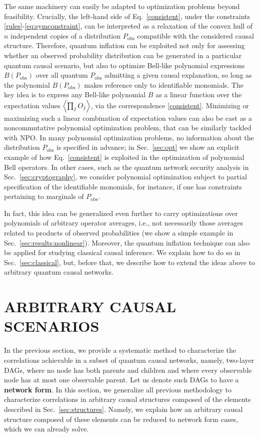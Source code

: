 \documentclass[superscriptaddress,aps,prx,nofootinbib,twocolumn,twoside,reprint,letterpaper,longbibliography]{revtex4-2}
\newcommand{\term}[1]{\textcolor{medblue}{\textbf{#1}}}
\DeclarePairedDelimiter{\expec}{\langle}{\rangle}
\begin{document}
The same machinery can easily be adapted to optimization problems beyond feasibility. Crucially, the left-hand side of Eq.~\eqref{consistent}, under the constraints \eqref{rules}-\eqref{eq:symconstraint}, can be interpreted as a relaxation of the convex hull of $n$ independent copies of a distribution $P_\text{obs}$ compatible with the considered causal structure.
Therefore, quantum inflation can be exploited not only for assessing whether an observed probability distribution can be generated in a particular quantum causal scenario, but also to optimize Bell-like polynomial expressions $B(P_\text{obs})$ over all quantum $P_\text{obs}$ admitting a given causal explanation, so long as the polynomial  $B(P_\text{obs})$ makes reference only to identifiable monomials.
The key idea is to express any Bell-like polynomial $B$ as a linear function over the expectation values $\expec*{\prod_j O_j}$, via the correspondence \eqref{consistent}. Minimizing or maximizing such a linear combination of expectation values can also be cast as a noncommutative polynomial optimization problem, that can be similarly tackled with NPO.
In many polynomial optimization problems, no information about the distribution $P_\text{obs}$ is specified in advance; in Sec.~\ref{sec:opt} we show an explicit example of how Eq.~\eqref{consistent} is exploited in the optimization of polynomial Bell operators. In other cases, such as the quantum network security analysis in Sec.~\ref{sec:cryptography}, we consider polynomial optimization subject to partial specification of the identifiable monomials, for instance, if one has constraints pertaining to marginals of $P_\text{obs}$.

In fact, this idea can be generalized even further to carry optimizations over polynomials of arbitrary operator averages, i.e., not necessarily those averages related to products of observed probabilities (we show a simple example in Sec.~\ref{sec:results:nonlinear}). Moreover, the quantum inflation technique can also be applied for studying classical causal inference. We explain how to do so in Sec.~\ref{sec:classical}, but, before that, we describe how to extend the ideas above to arbitrary quantum causal networks.

\section{ARBITRARY CAUSAL SCENARIOS}\label{sec:arbitrary}
In the previous section, we provide a systematic method to characterize the correlations achievable in a subset of quantum causal networks, namely, two-layer DAGs, where no node has both parents and children and where every observable node has at most one observable parent. Let us denote such DAGs to have a \term{network form}.
In this section, we generalize all previous methodology to characterize correlations in arbitrary causal structures composed of the elements described in Sec.~\ref{sec:structures}.
Namely, we explain how an arbitrary causal structure composed of these elements can be reduced to network form cases, which we can already solve.
\end{document}
